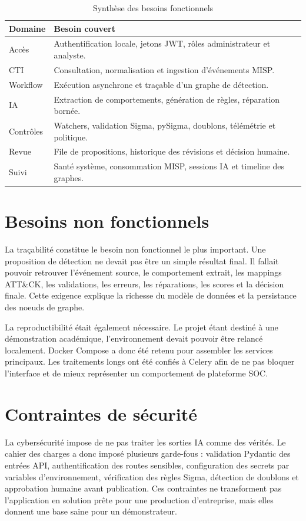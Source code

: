 \begin{longtable}{p{4cm}p{10cm}}
\caption{Synthèse des besoins fonctionnels}
\label{tab:besoins-fonctionnels}\\
\toprule
\textbf{Domaine} & \textbf{Besoin couvert}\\
\midrule
Accès & Authentification locale, jetons JWT, rôles administrateur et analyste.\\
CTI & Consultation, normalisation et ingestion d'événements MISP.\\
Workflow & Exécution asynchrone et traçable d'un graphe de détection.\\
IA & Extraction de comportements, génération de règles, réparation bornée.\\
Contrôles & Watchers, validation Sigma, pySigma, doublons, télémétrie et politique.\\
Revue & File de propositions, historique des révisions et décision humaine.\\
Suivi & Santé système, consommation MISP, sessions IA et timeline des graphes.\\
\bottomrule
\end{longtable}

\section{Besoins non fonctionnels}

La traçabilité constitue le besoin non fonctionnel le plus important. Une proposition de détection ne devait pas être un simple résultat final. Il fallait pouvoir retrouver l'événement source, le comportement extrait, les mappings ATT\&CK, les validations, les erreurs, les réparations, les scores et la décision finale. Cette exigence explique la richesse du modèle de données et la persistance des noeuds de graphe.

La reproductibilité était également nécessaire. Le projet étant destiné à une démonstration académique, l'environnement devait pouvoir être relancé localement. Docker Compose a donc été retenu pour assembler les services principaux. Les traitements longs ont été confiés à Celery afin de ne pas bloquer l'interface et de mieux représenter un comportement de plateforme SOC.

\section{Contraintes de sécurité}

La cybersécurité impose de ne pas traiter les sorties IA comme des vérités. Le cahier des charges a donc imposé plusieurs garde-fous : validation Pydantic des entrées API, authentification des routes sensibles, configuration des secrets par variables d'environnement, vérification des règles Sigma, détection de doublons et approbation humaine avant publication. Ces contraintes ne transforment pas l'application en solution prête pour une production d'entreprise, mais elles donnent une base saine pour un démonstrateur.

